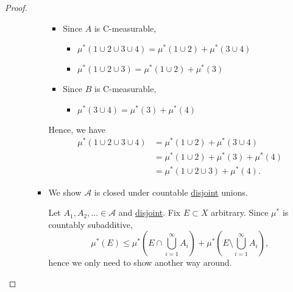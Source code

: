 \begin{proof}
\begin{enumerate}
\begin{enumerate}
\begin{itemize}
				            \begin{itemize}
					            \item Since \(A\) is C-measurable,
					                  \begin{itemize}
						                  \item \(\mu^{*} (1\cup 2\cup 3\cup 4) = \mu^{*} (1\cup 2) + \mu^{*} (3\cup 4)\)
						                  \item \(\mu^{*} (1\cup 2\cup 3) = \mu^{*} (1\cup 2) + \mu^{*} (3)\)
					                  \end{itemize}
					            \item Since \(B\) is C-measurable,
					                  \begin{itemize}
						                  \item \(\mu^{*} (3\cup 4) = \mu^{*} (3) + \mu^{*} (4)\)
					                  \end{itemize}
				            \end{itemize}
				            Hence, we have
				            \[
					            \begin{split}
						            \mu^{*} (1\cup 2\cup 3\cup 4) &= \mu^{*} (1\cup 2)+\mu^{*} (3\cup 4)\\
						            &= \mu^{*} (1\cup 2) + \mu^{*} (3) + \mu^{*} (4)\\
						            &= \mu^{*}(1\cup 2\cup 3) + \mu^{*} (4).
					            \end{split}
				            \]
				            \item We show \(\mathcal{A} \) is closed under countable \underline{disjoint} unions.

				                  \par Let \(A_1, A_2, \ldots \in\mathcal{A}\) and \underline{disjoint}.
				                  Fix \(E\subset X\) arbitrary. Since \(\mu^{*} \) is countably subadditive,
				                  \[
					                  \mu^{*} (E) \leq  \mu^{*} \left(E\cap \bigcup\limits_{i=1}^{\infty} A_{i}\right) + \mu^{*} \left(E\setminus \bigcup\limits_{i=1}^{\infty} A_{i}\right),
				                  \]
				                  hence we only need to show another way around.


\end{itemize}
\end{enumerate}
\end{enumerate}
\end{proof}
